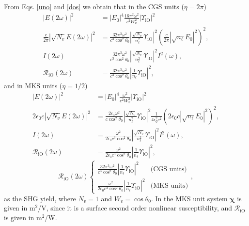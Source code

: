 From Eqs. \eqref{uno} and \eqref{dos} we obtain that in the CGS units ($\eta=2\pi$)
\begin{align}\label{r01}
|E(2\omega)|^2 
&= |E_{0}|^4\frac{16\pi^{2}\omega^{2}}{c^{2}W^2_{v}}
\left\vert  
\Upsilon_{\mathrm{iO}}
\right\vert^{2}
\nonumber\\
\frac{c}{2\pi}|\sqrt{N_{v}}E(2\omega)|^{2} 
&=
\frac{32\pi^{3}\omega^{2}}{c^{3}\cos^2\theta_{0}}
\left\vert  
\frac{\sqrt{N_{v}}}{n^{2}_{\ell}}
\Upsilon_{\mathrm{iO}}
\right\vert^{2} 
\left(\frac{c}{2\pi}|\sqrt{n_{\ell}}E_{0}|^{2}\right)^{2},
\nonumber\\ 
I(2\omega) 
&= \frac{32\pi^{3}\omega^{2}}{c^{3}\cos^2\theta_{0}}
\left\vert  
\frac{\sqrt{N_{v}}}{n^{2}_{\ell}}
\Upsilon_{\mathrm{iO}}
\right\vert^{2}I^{2}(\omega),
\nonumber\\
\mathcal{R}_{\mathrm{iO}}(2\omega) 
&= 
\frac{32\pi^{3}\omega^{2}}{c^{3}\cos^2\theta_{0}}
\left\vert  
\frac{1}{n_{\ell}}
\Upsilon_{\mathrm{iO}}
\right\vert^{2}
,
\end{align} 
and in MKS units ($\eta=1/2$)
\begin{align}\label{r01m}
|E(2\omega)|^2 
&= |E_{0}|^4
\frac{\omega^{2}}{c^{2}W^2_{v}}
\left\vert  
\Upsilon_{\mathrm{iO}}
\right\vert^{2}
\nonumber\\
2\epsilon_{0}c|\sqrt{N_{v}}E(2\omega)|^{2} 
&=
\frac{2\epsilon_{0}\omega^{2}}{c\cos^2\theta_{0}}
\left\vert  
\frac{\sqrt{N_{v}}}{n^{2}_{\ell}}
\Upsilon_{\mathrm{iO}}
\right\vert^{2} 
\frac{1}{4\epsilon^2_0c^2}\left(2\epsilon_{0}c|\sqrt{n_{\ell}}E_{0}|^{2}\right)^{2},
\nonumber\\ 
I(2\omega) 
&= 
\frac{\omega^{2}}{2\epsilon_{0}c^3\cos^2\theta_{0}}
\left\vert  
\frac{\sqrt{N_{v}}}{n^{2}_{\ell}}
\Upsilon_{\mathrm{iO}}
\right\vert^{2}I^{2}(\omega),
\nonumber\\
\mathcal{R}_{\mathrm{iO}}(2\omega) 
&= \frac{\omega^{2}}{2\epsilon_{0}c^3\cos^2\theta_{0}}
\left\vert  
\frac{1}{n_{\ell}}
\Upsilon_{\mathrm{iO}}
\right\vert^{2} 
,
\end{align} 
\begin{equation}\label{mc6}
\mathcal{R}_{\mathrm{iO}}(2\omega) 
\left\{
\begin{array}{cc} 
\frac{32\pi^{3}\omega^{2}}{c^{3}\cos^2\theta_{0}}
\left\vert  
\frac{1}{n_{\ell}}
\Upsilon_{\mathrm{iO}}
\right\vert^{2} 
& \text{(CGS units)} \\
\frac{\omega^{2}}{2\epsilon_{0}c^3\cos^2\theta_{0}}
\left\vert  
\frac{1}{n_{\ell}}
\Upsilon_{\mathrm{iO}}
\right\vert^{2} 
& \text{(MKS units)} 
\end{array}
\right.
,
\end{equation}
as the SHG yield, where $N_{v}=1$ and $W_{v}=\cos\theta_{0}$. In the MKS unit system $\boldsymbol{\chi}$ is given in m$^2$/V, since it is a surface second order nonlinear susceptibility, and $\mathcal{R}_{\mathrm{iO}}$ is given in m$^2$/W.

